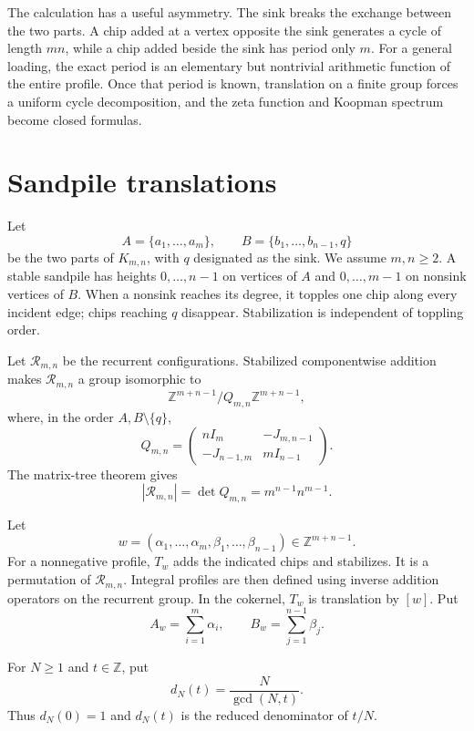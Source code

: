 \documentclass[11pt,a4paper]{amsart}
\theoremstyle{definition}
\theoremstyle{remark}
\newcommand{\Z}{\mathbb Z}
\newcommand{\Rcal}{\mathcal R}
\begin{document}
The calculation has a useful asymmetry.  The sink breaks the exchange between
the two parts.  A chip added at a vertex opposite the sink generates a cycle
of length $mn$, while a chip added beside the sink has period only $m$.
For a general loading, the exact period is an elementary but nontrivial
arithmetic function of the entire profile.  Once that period is known,
translation on a finite group forces a uniform cycle decomposition, and the
zeta function and Koopman spectrum become closed formulas.

\section{Sandpile translations}

Let
\[
 A=\{a_1,\ldots,a_m\},\qquad
 B=\{b_1,\ldots,b_{n-1},q\}
\]
be the two parts of $K_{m,n}$, with $q$ designated as the sink.  We assume
$m,n\geq2$.  A stable sandpile has heights $0,\ldots,n-1$ on vertices of
$A$ and $0,\ldots,m-1$ on nonsink vertices of $B$.  When a nonsink reaches
its degree, it topples one chip along every incident edge; chips reaching
$q$ disappear.  Stabilization is independent of toppling order.

Let $\Rcal_{m,n}$ be the recurrent configurations.  Stabilized componentwise
addition makes $\Rcal_{m,n}$ a group isomorphic to
\[
 \Z^{m+n-1}/Q_{m,n}\Z^{m+n-1},
\]
where, in the order $A,B\setminus\{q\}$,
\begin{equation}\label{eq:laplacian}
 Q_{m,n}=
 \begin{pmatrix}
 nI_m&-J_{m,n-1}\\
 -J_{n-1,m}&mI_{n-1}
 \end{pmatrix}.
\end{equation}
The matrix-tree theorem gives
\begin{equation}\label{eq:tree-count}
 |\Rcal_{m,n}|=\det Q_{m,n}=m^{n-1}n^{m-1}.
\end{equation}

Let
\[
 w=(\alpha_1,\ldots,\alpha_m,
       \beta_1,\ldots,\beta_{n-1})\in\Z^{m+n-1}.
\]
For a nonnegative profile, $T_w$ adds the indicated chips and stabilizes.  It
is a permutation of $\Rcal_{m,n}$.  Integral profiles are then defined using
inverse addition operators on the recurrent group.  In the cokernel, $T_w$
is translation by $[w]$.  Put
\[
 A_w=\sum_{i=1}^{m}\alpha_i,
 \qquad B_w=\sum_{j=1}^{n-1}\beta_j.
\]

For $N\geq1$ and $t\in\Z$, put
\[
 d_N(t)=\frac{N}{\gcd(N,t)}.
\]
Thus $d_N(0)=1$ and $d_N(t)$ is the reduced denominator of $t/N$.
\end{document}
